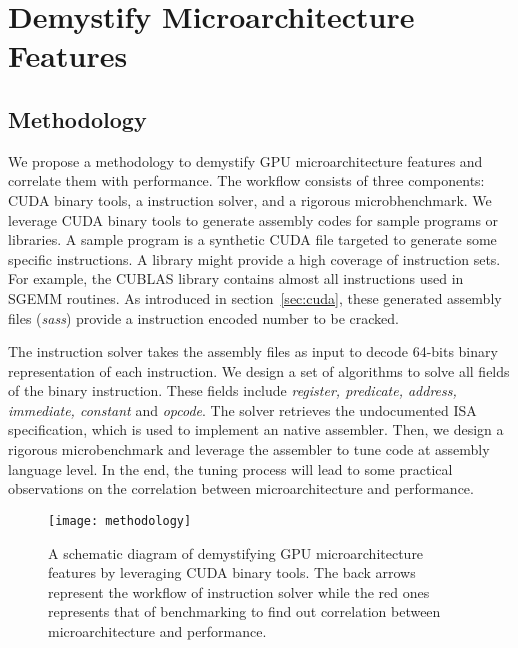 \section{Demystify Microarchitecture Features}
\label{sec:assembler}

\subsection{Methodology}
We propose a methodology to demystify GPU microarchitecture features and correlate them with performance. The workflow consists of three components: CUDA binary tools, a instruction solver, and a rigorous microbhenchmark. We leverage CUDA binary tools to generate assembly codes for sample programs or libraries. A sample program is a synthetic CUDA file targeted to generate some specific instructions. A library might provide a high coverage of instruction sets. For example, the CUBLAS library contains almost all instructions used in SGEMM routines. As introduced in section~\ref{sec:cuda}, these generated assembly files ({\em sass}) provide a instruction encoded number to be cracked.

The instruction solver takes the assembly files as input to decode 64-bits binary representation of each instruction. We design a set of algorithms to solve all fields of the binary instruction. These fields include {\em register, predicate, address, immediate, constant} and {\em opcode}. The solver retrieves the undocumented ISA specification, which is used to implement an native assembler. Then, we design a rigorous microbenchmark and leverage the assembler to tune code at assembly language level. In the end, the tuning process will lead to some practical observations on the correlation between microarchitecture and performance.

\begin{figure}[htbp]
\begin{center}
\texttt{[image: methodology]}
\caption{A schematic diagram of demystifying GPU microarchitecture features by leveraging CUDA binary tools. The back arrows represent the workflow of instruction solver while the red ones represents that of benchmarking to find out correlation between microarchitecture and performance.}
\label{fig:workflow}
\end{center}
\end{figure}

